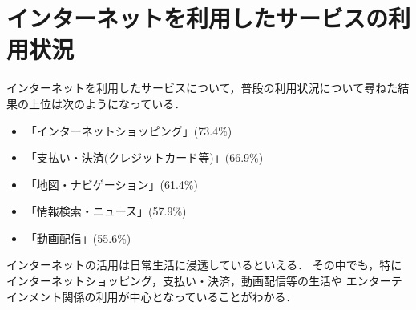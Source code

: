 \documentclass[a4paper,11pt,dvipdfmx]{ujarticle}
\begin{document}
\section{インターネットを利用したサービスの利用状況}

インターネットを利用したサービスについて，普段の利用状況について尋ねた結果\cite{corona}の上位は次のようになっている．
\begin{itemize}
    \item 「インターネットショッピング」(73.4\%)
    \item 「支払い・決済(クレジットカード等)」(66.9\%)
    \item 「地図・ナビゲーション」(61.4\%)
    \item 「情報検索・ニュース」(57.9\%)
    \item 「動画配信」(55.6\%)
\end{itemize}
インターネットの活用は日常生活に浸透しているといえる．
その中でも，特にインターネットショッピング，支払い・決済，動画配信等の生活や
エンターテインメント関係の利用が中心となっていることがわかる．



\end{document}

